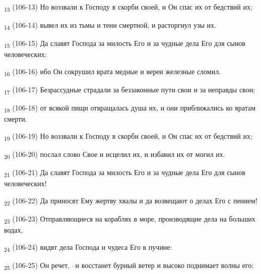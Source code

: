 \begin{tcolorbox}
\textsubscript{13} (106-13) Но воззвали к Господу в скорби своей, и Он спас их от бедствий их;
\end{tcolorbox}
\begin{tcolorbox}
\textsubscript{14} (106-14) вывел их из тьмы и тени смертной, и расторгнул узы их.
\end{tcolorbox}
\begin{tcolorbox}
\textsubscript{15} (106-15) Да славят Господа за милость Его и за чудные дела Его для сынов человеческих:
\end{tcolorbox}
\begin{tcolorbox}
\textsubscript{16} (106-16) ибо Он сокрушил врата медные и вереи железные сломил.
\end{tcolorbox}
\begin{tcolorbox}
\textsubscript{17} (106-17) Безрассудные страдали за беззаконные пути свои и за неправды свои;
\end{tcolorbox}
\begin{tcolorbox}
\textsubscript{18} (106-18) от всякой пищи отвращалась душа их, и они приближались ко вратам смерти.
\end{tcolorbox}
\begin{tcolorbox}
\textsubscript{19} (106-19) Но воззвали к Господу в скорби своей, и Он спас их от бедствий их;
\end{tcolorbox}
\begin{tcolorbox}
\textsubscript{20} (106-20) послал слово Свое и исцелил их, и избавил их от могил их.
\end{tcolorbox}
\begin{tcolorbox}
\textsubscript{21} (106-21) Да славят Господа за милость Его и за чудные дела Его для сынов человеческих!
\end{tcolorbox}
\begin{tcolorbox}
\textsubscript{22} (106-22) Да приносят Ему жертву хвалы и да возвещают о делах Его с пением!
\end{tcolorbox}
\begin{tcolorbox}
\textsubscript{23} (106-23) Отправляющиеся на кораблях в море, производящие дела на больших водах,
\end{tcolorbox}
\begin{tcolorbox}
\textsubscript{24} (106-24) видят дела Господа и чудеса Его в пучине:
\end{tcolorbox}
\begin{tcolorbox}
\textsubscript{25} (106-25) Он речет, --и восстанет бурный ветер и высоко поднимает волны его:
\end{tcolorbox}
